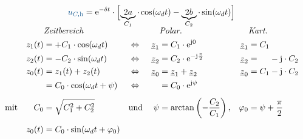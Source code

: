 \begin{frame}[t]\ftx{\subsubsecname}%
\b{%
\begin{align*}
    \ecv{u_{C,\mathrm{h}}} &= \mathrm{e}^{-\delta t} \cdot
    \left[\vphantom{\Big|}\smash{
    \underbrace{2a}_{C_1} \cdot \cos(\omega_d t) - \underbrace{2b}_{C_2} \cdot \sin(\omega_d t)
    }\right]
\end{align*}%
}%
\ifvmode\vspace*{-\baselineskip}\setlength{\parskip}{4pt}\fi%
\begin{align}
    &&&\mathrlap{\textit{Zeitbereich}}&&&&\mathrlap{\textit{Polar.}}&&\mathrlap{\textit{Kart.}} &&\nonumber\\
    &&
        z_1(t) &= +C_1 \cdot \cos(\omega_d t)&
        &\Leftrightarrow&
        \underline{z}_1 &= C_1 \cdot \mathrm{e}^{\mathrm{j}0} &
        \underline{z}_1 &= C_1 \nonumber\\
    &&
        z_2(t) &= -C_2 \cdot \sin(\omega_d t)&
        &\Leftrightarrow&
        \underline{z}_2 &= C_2 \cdot \mathrm{e}^{-\mathrm{j}\frac{\pi}{2}} &
        \underline{z}_2 &= \hphantom{C_1} - \mathrm{j} \cdot C_2 \nonumber\\
    &&
        z_0(t) &= z_1(t) + z_2(t)&
        &\Leftrightarrow&
        \underline{z}_0 &= \underline{z}_1 + \underline{z}_2 &
        \underline{z}_0 &= C_1 - \mathrm{j} \cdot C_2 \nonumber\\
    &&
        &= C_0 \cdot \cos(\omega_d t + \psi)&
        &\Leftrightarrow&
        \hphantom{z_0} &= C_0 \cdot \mathrm{e}^{\mathrm{j}\psi} \nonumber\\[4pt]
    &\text{mit}&
        C_0 &= \sqrt{C_1^2 + C_2^2}&
        &\text{und}&
        \psi  &= \arctan\left(-\frac{C_2}{C_1}\right),
        &\varphi_0 &= \psi + \frac{\pi}{2} \nonumber\\[4pt]
    &&
        z_0(t) &= C_0 \cdot \sin(\omega_d t + \varphi_0) \label{eq:dgl:rlc:homolsg:periodisch:zeigeraddition}
\end{align}%
\b{%
\vfill%
\begin{align*}
    &&

\end{align*}}
\end{frame}
